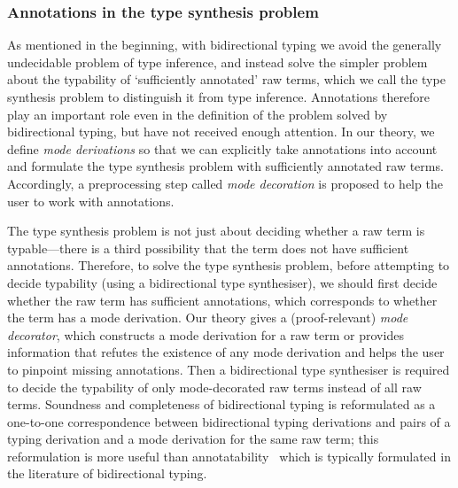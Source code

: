 \subsubsection{Annotations in the type synthesis problem}

As mentioned in the beginning, with bidirectional typing we avoid the generally undecidable problem of type inference, and instead solve the simpler problem about the typability of `sufficiently annotated' raw terms, which we call the type synthesis problem to distinguish it from type inference.
Annotations therefore play an important role even in the definition of the problem solved by bidirectional typing, but have not received enough attention.
In our theory, we define \emph{mode derivations} so that we can explicitly take annotations into account and formulate the type synthesis problem with sufficiently annotated raw terms.
Accordingly, a preprocessing step called \emph{mode decoration} is proposed to help the user to work with annotations.

The type synthesis problem is not just about deciding whether a raw term is typable---there is a third possibility that the term does not have sufficient annotations.
Therefore, to solve the type synthesis problem, before attempting to decide typability (using a bidirectional type synthesiser), we should first decide whether the raw term has sufficient annotations, which corresponds to whether the term has a mode derivation.
Our theory gives a (proof-relevant) \emph{mode decorator}, which constructs a mode derivation for a raw term or provides information that refutes the existence of any mode derivation and helps the user to pinpoint missing annotations.
Then a bidirectional type synthesiser is required to decide the typability of only mode-decorated raw terms instead of all raw terms.
Soundness and completeness of bidirectional typing is reformulated as a one-to-one correspondence between bidirectional typing derivations and pairs of a typing derivation and a mode derivation for the same raw term; this reformulation is more useful than annotatability~\cite[Section~3.2]{Dunfield2021} which is typically formulated in the literature of bidirectional typing.


